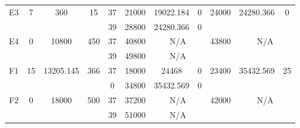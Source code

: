 \begin{sidewaystable}
\begin{tabular}{c||c|c|c||c|c|c|c||c|c|c}
         &
        
      \\
      \hline
      \multirow{2}{*}{E3} &
      \multirow{2}{*}{7} &
      \multirow{2}{*}{360} &
      \multirow{2}{*}{15} &
      37 &
      21000 &
        19022.184 &
        0 &
      \multirow{2}{*}{24000} &
        \multirow{2}{*}{24280.366} &
        \multirow{2}{*}{0}
      \\
      \cline{5-8}
       &
       &
       &
       &
      39 &
      28800 &
        24280.366 &
        0 &
      
         &
        
      \\
      \hline
      \multirow{2}{*}{E4} &
      \multirow{2}{*}{0} &
      \multirow{2}{*}{10800} &
      \multirow{2}{*}{450} &
      37 &
      40800 &
        \multicolumn{2}{|c||}{N/A} &
      \multirow{2}{*}{43800} &
        \multicolumn{2}{c}{\multirow{2}{*}{N/A}}
      \\
      \cline{5-8}
       &
       &
       &
       &
      39 &
      49800 &
        \multicolumn{2}{|c||}{N/A} &
      
        
      \\
      \hline
      \multirow{2}{*}{F1} &
      \multirow{2}{*}{15} &
      \multirow{2}{*}{13205.145} &
      \multirow{2}{*}{366} &
      37 &
      18000 &
        24468 &
        0 &
      \multirow{2}{*}{23400} &
        \multirow{2}{*}{35432.569} &
        \multirow{2}{*}{25}
      \\
      \cline{5-8}
       &
       &
       &
       &
      0 &
      34800 &
        35432.569 &
        0 &
      
         &
        
      \\
      \hline
      \multirow{2}{*}{F2} &
      \multirow{2}{*}{0} &
      \multirow{2}{*}{18000} &
      \multirow{2}{*}{500} &
      37 &
      37200 &
        \multicolumn{2}{|c||}{N/A} &
      \multirow{2}{*}{42000} &
        \multicolumn{2}{c}{\multirow{2}{*}{N/A}}
      \\
      \cline{5-8}
       &
       &
       &
       &
      39 &
      51000 &
        \multicolumn{2}{|c||}{N/A} &
      
        
      \\
\end{tabular}
\label{table:RASDATASET3} 
\end{sidewaystable}